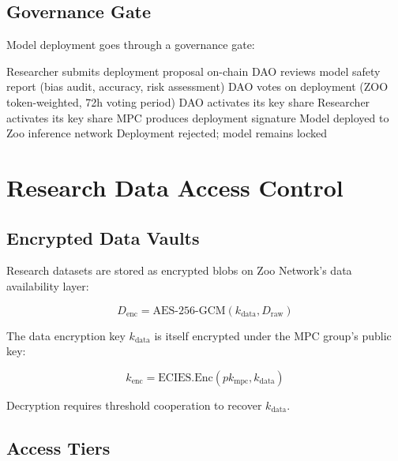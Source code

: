 \documentclass[11pt,letterpaper]{article}
\begin{document}
\subsection{Governance Gate}

Model deployment goes through a governance gate:

\begin{algorithm}[t]
\caption{Model Deployment with MPC Governance}
\label{alg:deploy}
\begin{algorithmic}[1]
\STATE Researcher submits deployment proposal on-chain
\STATE DAO reviews model safety report (bias audit, accuracy, risk assessment)
\STATE DAO votes on deployment (ZOO token-weighted, 72h voting period)
    \STATE DAO activates its key share
    \STATE Researcher activates its key share
    \STATE MPC produces deployment signature
    \STATE Model deployed to Zoo inference network
\ELSE
    \STATE Deployment rejected; model remains locked
\ENDIF
\end{algorithmic}
\end{algorithm}

\section{Research Data Access Control}
\label{sec:data-access}

\subsection{Encrypted Data Vaults}

Research datasets are stored as encrypted blobs on Zoo Network's data availability layer:

\begin{equation}
D_{\text{enc}} = \text{AES-256-GCM}(k_{\text{data}}, D_{\text{raw}})
\end{equation}

The data encryption key $k_{\text{data}}$ is itself encrypted under the MPC group's public key:

\begin{equation}
k_{\text{enc}} = \text{ECIES.Enc}(pk_{\text{mpc}}, k_{\text{data}})
\end{equation}

Decryption requires threshold cooperation to recover $k_{\text{data}}$.

\subsection{Access Tiers}
\end{document}
